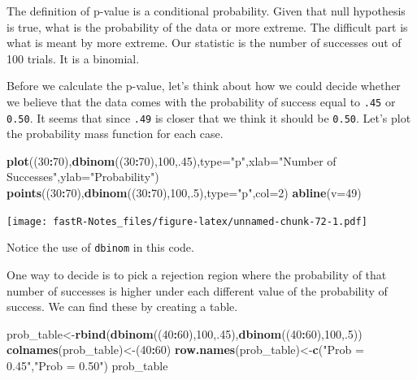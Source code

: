 \documentclass[]{book}
\newenvironment{Shaded}{\begin{snugshade}}{\end{snugshade}}
\newcommand{\KeywordTok}[1]{\textcolor[rgb]{0.13,0.29,0.53}{\textbf{#1}}}
\newcommand{\DataTypeTok}[1]{\textcolor[rgb]{0.13,0.29,0.53}{#1}}
\newcommand{\DecValTok}[1]{\textcolor[rgb]{0.00,0.00,0.81}{#1}}
\newcommand{\StringTok}[1]{\textcolor[rgb]{0.31,0.60,0.02}{#1}}
\newcommand{\OperatorTok}[1]{\textcolor[rgb]{0.81,0.36,0.00}{\textbf{#1}}}
\newcommand{\NormalTok}[1]{#1}
\theoremstyle{definition}
\theoremstyle{definition}
\theoremstyle{definition}
\theoremstyle{remark}
\begin{document}
The definition of p-value is a conditional probability. Given that null
hypothesis is true, what is the probability of the data or more extreme.
The difficult part is what is meant by more extreme. Our statistic is
the number of successes out of 100 trials. It is a binomial.

Before we calculate the p-value, let's think about how we could decide
whether we believe that the data comes with the probability of success
equal to \texttt{.45} or \texttt{0.50}. It seems that since \texttt{.49}
is closer that we think it should be \texttt{0.50}. Let's plot the
probability mass function for each case.

\begin{Shaded}
\begin{Highlighting}[]
\KeywordTok{plot}\NormalTok{((}\DecValTok{30}\OperatorTok{:}\DecValTok{70}\NormalTok{),}\KeywordTok{dbinom}\NormalTok{((}\DecValTok{30}\OperatorTok{:}\DecValTok{70}\NormalTok{),}\DecValTok{100}\NormalTok{,.}\DecValTok{45}\NormalTok{),}\DataTypeTok{type=}\StringTok{"p"}\NormalTok{,}\DataTypeTok{xlab=}\StringTok{"Number of Successes"}\NormalTok{,}\DataTypeTok{ylab=}\StringTok{"Probability"}\NormalTok{)}
\KeywordTok{points}\NormalTok{((}\DecValTok{30}\OperatorTok{:}\DecValTok{70}\NormalTok{),}\KeywordTok{dbinom}\NormalTok{((}\DecValTok{30}\OperatorTok{:}\DecValTok{70}\NormalTok{),}\DecValTok{100}\NormalTok{,.}\DecValTok{5}\NormalTok{),}\DataTypeTok{type=}\StringTok{"p"}\NormalTok{,}\DataTypeTok{col=}\DecValTok{2}\NormalTok{)}
\KeywordTok{abline}\NormalTok{(}\DataTypeTok{v=}\DecValTok{49}\NormalTok{)}
\end{Highlighting}
\end{Shaded}

\texttt{[image: fastR-Notes\_files/figure-latex/unnamed-chunk-72-1.pdf]}

Notice the use of \texttt{dbinom} in this code.

One way to decide is to pick a rejection region where the probability of
that number of successes is higher under each different value of the
probability of success. We can find these by creating a table.

\begin{Shaded}
\begin{Highlighting}[]
\NormalTok{prob_table<-}\KeywordTok{rbind}\NormalTok{(}\KeywordTok{dbinom}\NormalTok{((}\DecValTok{40}\OperatorTok{:}\DecValTok{60}\NormalTok{),}\DecValTok{100}\NormalTok{,.}\DecValTok{45}\NormalTok{),}\KeywordTok{dbinom}\NormalTok{((}\DecValTok{40}\OperatorTok{:}\DecValTok{60}\NormalTok{),}\DecValTok{100}\NormalTok{,.}\DecValTok{5}\NormalTok{))}
\KeywordTok{colnames}\NormalTok{(prob_table)<-(}\DecValTok{40}\OperatorTok{:}\DecValTok{60}\NormalTok{)}
\KeywordTok{row.names}\NormalTok{(prob_table)<-}\KeywordTok{c}\NormalTok{(}\StringTok{"Prob = 0.45"}\NormalTok{,}\StringTok{"Prob = 0.50"}\NormalTok{)}
\NormalTok{prob_table}
\end{Highlighting}
\end{Shaded}
\end{document}
